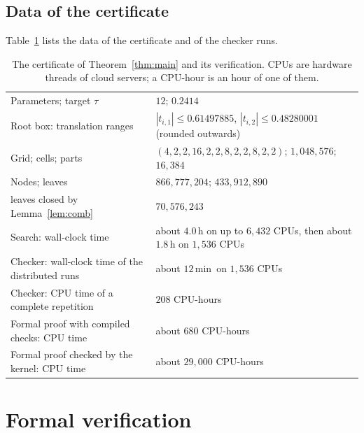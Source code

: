 \documentclass[11pt]{amsart}
\theoremstyle{definition}
\theoremstyle{remark}
\numberwithin{equation}{section}
\newcommand{\NCELLS}{1{,}048{,}576}
\newcommand{\NPARTS}{16{,}384}
\newcommand{\GRID}{(4,2,2,16,2,2,8,2,2,8,2,2)}
\newcommand{\TAU}{0.2414}
\newcommand{\NLEAVES}{433{,}912{,}890}
\newcommand{\NNODES}{866{,}777{,}204}
\newcommand{\NKLEAVES}{70{,}576{,}243}
\newcommand{\XMAX}{0.61497885}        %
\newcommand{\YMAX}{0.48280001}
\newcommand{\DEPTHROWS}{}
\newcommand{\RUNFACTS}{}
\newcommand{\SEARCHTIME}{about $4.0$\,h on up to $6{,}432$ CPUs, then about $1.8$\,h on $1{,}536$ CPUs}
\newcommand{\CHECKTIME}{about $12$\,min}
\newcommand{\RERUNCPU}{208}
\newcommand{\LEANCPU}{680}
\newcommand{\KCPU}{29{,}000}
\begin{document}
\subsection{Data of the certificate}
Table~\ref{tab:verif} lists the data of the certificate and of the checker runs.\RUNFACTS

\begin{table}[ht]
\centering
\caption{The certificate of Theorem~\ref{thm:main} and its verification. CPUs are hardware threads of cloud servers; a CPU-hour is an hour of one of them.}\label{tab:verif}
\small
\begin{tabular}{@{}>{\raggedright\arraybackslash}p{6.4cm}>{\raggedright\arraybackslash}p{6.9cm}@{}}
\toprule
Parameters; target $\tau$ & $12$; $\TAU$\\
Root box: translation ranges & $|t_{i,1}|\le\XMAX$, $|t_{i,2}|\le\YMAX$ (rounded outwards)\\
Grid; cells; parts & $\GRID$; $\NCELLS$; $\NPARTS$\\
Nodes; leaves & $\NNODES$; $\NLEAVES$\\
\quad leaves closed by Lemma~\ref{lem:comb} & $\NKLEAVES$\\
\DEPTHROWS
Search: wall-clock time & \SEARCHTIME\\
Checker: wall-clock time of the distributed runs & \CHECKTIME\ on $1{,}536$ CPUs\\
Checker: CPU time of a complete repetition & $\RERUNCPU$ CPU-hours\\
Formal proof with compiled checks: CPU time & about $\LEANCPU$ CPU-hours\\
Formal proof checked by the kernel: CPU time & about $\KCPU$ CPU-hours\\
\bottomrule
\end{tabular}
\end{table}



\section{Formal verification}\label{sec:lean}
\end{document}
